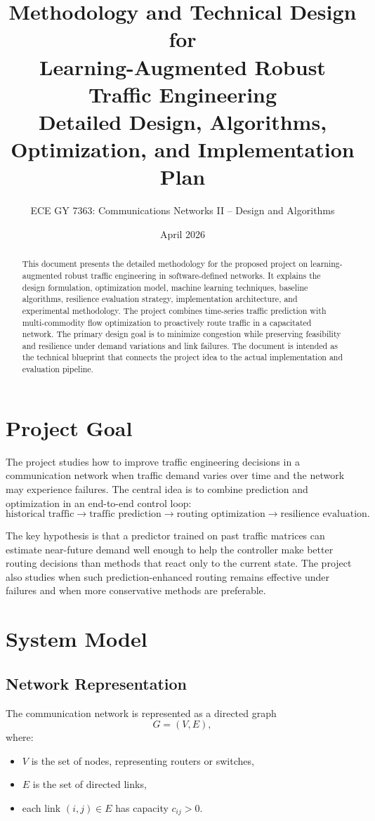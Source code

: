 \documentclass[11pt]{article}
\title{\textbf{Methodology and Technical Design for}\\[0.2em]\textbf{Learning-Augmented Robust Traffic Engineering}\\[0.4em]
\large Detailed Design, Algorithms, Optimization, and Implementation Plan}
\author{ECE GY 7363: Communications Networks II -- Design and Algorithms}
\date{April 2026}
\begin{document}
\maketitle

\begin{abstract}
This document presents the detailed methodology for the proposed project on learning-augmented robust traffic engineering in software-defined networks. It explains the design formulation, optimization model, machine learning techniques, baseline algorithms, resilience evaluation strategy, implementation architecture, and experimental methodology. The project combines time-series traffic prediction with multi-commodity flow optimization to proactively route traffic in a capacitated network. The primary design goal is to minimize congestion while preserving feasibility and resilience under demand variations and link failures. The document is intended as the technical blueprint that connects the project idea to the actual implementation and evaluation pipeline.
\end{abstract}

\section{Project Goal}
The project studies how to improve traffic engineering decisions in a communication network when traffic demand varies over time and the network may experience failures. The central idea is to combine prediction and optimization in an end-to-end control loop:
\[
\text{historical traffic} \rightarrow \text{traffic prediction} \rightarrow \text{routing optimization} \rightarrow \text{resilience evaluation}.
\]

The key hypothesis is that a predictor trained on past traffic matrices can estimate near-future demand well enough to help the controller make better routing decisions than methods that react only to the current state. The project also studies when such prediction-enhanced routing remains effective under failures and when more conservative methods are preferable.

\section{System Model}
\subsection{Network Representation}
The communication network is represented as a directed graph
\[
G = (V,E),
\]
where:
\begin{itemize}
    \item $V$ is the set of nodes, representing routers or switches,
    \item $E$ is the set of directed links,
    \item each link $(i,j) \in E$ has capacity $c_{ij} > 0$.
\end{itemize}
\end{document}
